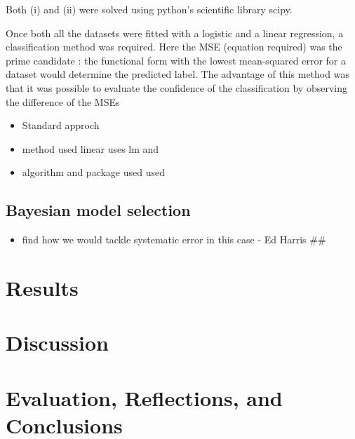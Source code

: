 \documentclass[]{article}
\providecommand{\tightlist}{%
  \setlength{\itemsep}{0pt}\setlength{\parskip}{0pt}}
\begin{document}
Both (i) and (ii) were solved using python's scientific library scipy.

Once both all the datasets were fitted with a logistic and a linear
regression, a classification method was required. Here the MSE (equation
required) was the prime candidate : the functional form with the lowest
mean-squared error for a dataset would determine the predicted label.
The advantage of this method was that it was possible to evaluate the
confidence of the classification by observing the difference of the MSEs

\begin{itemize}
\tightlist
\item
  Standard approch
\item
  method used linear uses lm and
\item
  algorithm and package used used
\end{itemize}

\hypertarget{bayesian-model-selection}{%
\subsection{Bayesian model selection}\label{bayesian-model-selection}}

\begin{itemize}
\tightlist
\item
  find how we would tackle systematic error in this case - Ed Harris
  \#\#
\end{itemize}

\hypertarget{results}{%
\section{Results}\label{results}}

\hypertarget{discussion}{%
\section{Discussion}\label{discussion}}

\hypertarget{evaluation-reflections-and-conclusions}{%
\section{Evaluation, Reflections, and
Conclusions}\label{evaluation-reflections-and-conclusions}}
\end{document}
